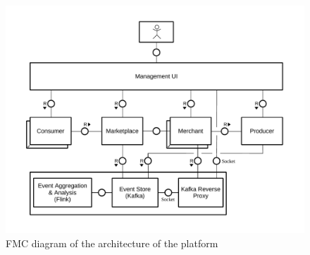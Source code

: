 \begin{figure}
	\centering
	\includegraphics[width=\textwidth]{figures/pricewars-architecture}
	\caption[see this in list of figures]
	{FMC diagram of the architecture of the \pricewars platform}
	\label{fig:platform_architecture}
\end{figure}

